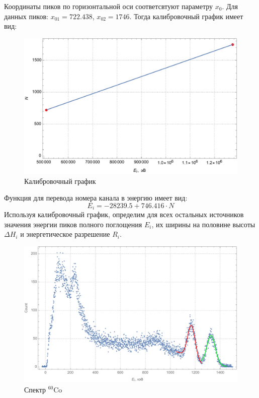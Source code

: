 \documentclass[a4paper, 12pt]{article}
\begin{document}
	 \par
	 Координаты пиков по горизонтальной оси соответсвтуют параметру $x_0$. Для данных пиков: $x_{01}=722.438$, $x_{02}=1746$. Тогда калибровочный график имеет вид:
	 \begin{figure}[!htb]
	 	\centering
	 	\includegraphics[scale=0.7]{calibrator.pdf}
	 	\caption{Калибровочный график}
	 \end{figure}
	 \par
	 Функция для перевода номера канала в энергию имеет вид:
	 \begin{equation}
	 	E_i=-28239.5 + 746.416\cdot N
	 \end{equation}
	 Используя калибровочный график, определим для всех остальных источников значения энергии пиков полного поглощения $E_i$, их ширины на половине высоты $\Delta H_i$ и энергетическое разрешение $R_i$.
	 \begin{figure}[!htb]
	 	\centering
	 	\includegraphics[scale=0.73]{co60.pdf}
	 	\caption{Спектр $^{60}\text{Co}$}
	 \end{figure}
\end{document}
